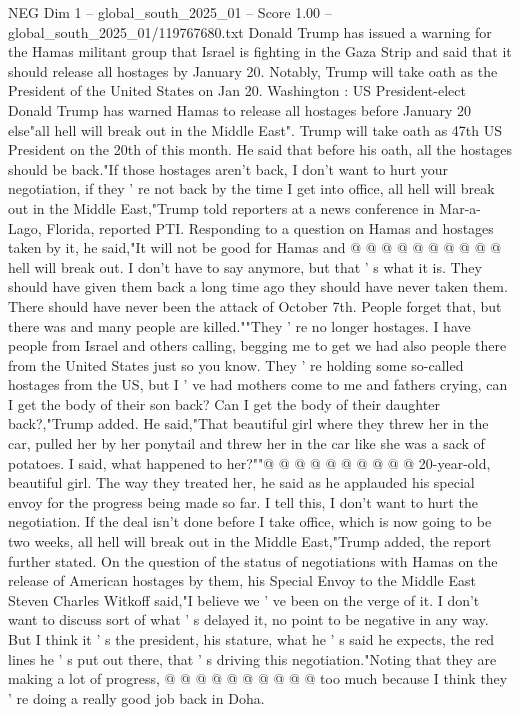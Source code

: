 \begin{textsample}{NEG Dim 1 – global\_south\_2025\_01 – Score 1.00 – global\_south\_2025\_01/119767680.txt}  \label{ex:f1_neg_151}
Donald Trump has issued a warning for the Hamas militant group that Israel is fighting in the Gaza Strip and said that it should release all hostages by January 20.
Notably, Trump will take oath as the President of the United States on Jan 20.
Washington : US President-elect Donald Trump has warned Hamas to release all hostages before January 20 else"all hell will break out in the Middle East".
Trump will take oath as 47th US President on the 20th of this month.
He said that before his oath, all the hostages should be back."If those hostages aren't back, I don't want to hurt your negotiation, if they ' re not back by the time I get into office, all hell will break out in the Middle East,"Trump told reporters at a news conference in Mar-a-Lago, Florida, reported PTI.
Responding to a question on Hamas and hostages taken by it, he said,"It will not be good for Hamas and @ @ @ @ @ @ @ @ @ @ hell will break out.
I don't have to say anymore, but that ' s what it is.
They should have given them back a long time ago they should have never taken them.
There should have never been the attack of October 7th.
People forget that, but there was and many people are killed.""They ' re no longer hostages.
I have people from Israel and others calling, begging me to get we had also people there from the United States just so you know.
They ' re holding some so-called hostages from the US, but I ' ve had mothers come to me and fathers crying, can I get the body of their son back?
Can I get the body of their daughter back?,"Trump added.
He said,"That beautiful girl where they threw her in the car, pulled her by her ponytail and threw her in the car like she was a sack of potatoes.
I said, what happened to her?""@ @ @ @ @ @ @ @ @ @ 20-year-old, beautiful girl.
The way they treated her, he said as he applauded his special envoy for the progress being made so far.
I tell this, I don't want to hurt the negotiation.
If the deal isn't done before I take office, which is now going to be two weeks, all hell will break out in the Middle East,"Trump added, the report further stated.
On the question of the status of negotiations with Hamas on the release of American hostages by them, his Special Envoy to the Middle East Steven Charles Witkoff said,"I believe we ' ve been on the verge of it.
I don't want to discuss sort of what ' s delayed it, no point to be negative in any way.
But I think it ' s the president, his stature, what he ' s said he expects, the red lines he ' s put out there, that ' s driving this negotiation."Noting that they are making a lot of progress, @ @ @ @ @ @ @ @ @ @ too much because I think they ' re doing a really good job back in Doha.

\end{textsample}
